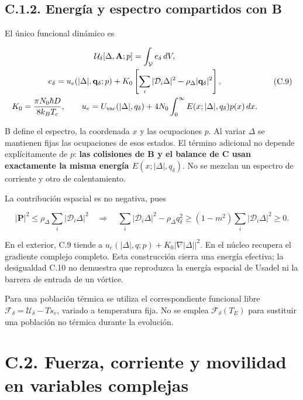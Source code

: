 \documentclass[
  spanish,
  10pt,
  a4paper,
]{article}
\begin{document}
\subsection{C.1.2. Energía y espectro compartidos con
B}\label{c.1.2.-energuxeda-y-espectro-compartidos-con-b}

El único funcional dinámico es

\[
\begin{gathered}
\mathcal U_\delta[\Delta,\mathbf A;p]=\int_{\mathcal V}e_\delta\,dV,\\
e_\delta=u_e(|\Delta|,\mathbf q_\delta;p)
+K_0\left[\sum_i|\mathcal D_i\Delta|^2
-\rho_\Delta|\mathbf q_\delta|^2\right],\\
K_0=\frac{\pi N_0\hbar D}{8k_BT_c},\qquad
u_e=U_{\rm vac}(|\Delta|,q_\delta)
+4N_0\int_0^\infty E(x;|\Delta|,q_\delta)p(x)\,dx.
\end{gathered}\tag{C.9}
\]

B define el espectro, la coordenada \(x\) y las ocupaciones \(p\). Al
variar \(\Delta\) se mantienen fijas las ocupaciones de esos estados. El
término adicional no depende explícitamente de \(p\): \textbf{las
colisiones de B y el balance de C usan exactamente la misma energía
\(E(x;|\Delta|,q_\delta)\)}. No se mezclan un espectro de corriente y
otro de calentamiento.

La contribución espacial es no negativa, pues

\[
|\mathbf P|^2\leq\rho_\Delta\sum_i|\mathcal D_i\Delta|^2
\quad\Longrightarrow\quad
\sum_i|\mathcal D_i\Delta|^2-\rho_\Delta q_\delta^2
\geq(1-m^2)\sum_i|\mathcal D_i\Delta|^2\geq0.
\tag{C.10}
\]

En el exterior, C.9 tiende a
\(u_e(|\Delta|,q;p)+K_0|\nabla|\Delta||^2\). En el núcleo recupera el
gradiente complejo completo. Esta construcción cierra una energía
efectiva; la desigualdad C.10 no demuestra que reproduzca la energía
espacial de Usadel ni la barrera de entrada de un vórtice.

Para una población térmica se utiliza el correspondiente funcional libre
\(\mathcal F_\delta=\mathcal U_\delta-Ts_e\), variado a temperatura
fija. No se emplea \(\mathcal F_\delta(T_E)\) para sustituir una
población no térmica durante la evolución.

\section{C.2. Fuerza, corriente y movilidad en variables
complejas}\label{c.2.-fuerza-corriente-y-movilidad-en-variables-complejas}
\end{document}
